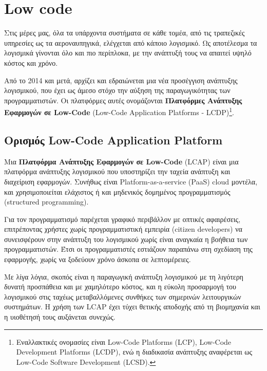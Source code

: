 \chapter{Low code}
    Στις μέρες μας, όλα τα υπάρχοντα συστήματα σε κάθε τομέα, από τις τραπεζικές υπηρεσίες ως τα αεροναυπηγικά, ελέγχεται από κάποιο λογισμικό.
    Ως αποτέλεσμα τα λογισμικά γίνονται όλο και πιο περίπλοκα, με την ανάπτυξή τους να απαιτεί υψηλό κόστος και χρόνο.

    Από το 2014 και μετά, αρχίζει και εδραιώνεται μια νέα προσέγγιση ανάπτυξης λογισμικού, που έχει ως άμεσο στόχο την αύξηση της παραγωγικότητας των προγραμματιστών.
    Οι πλατφόρμες αυτές ονομάζονται \textbf{Πλατφόρμες Ανάπτυξης Εφαρμογών σε Low-Code} (Low-Code Application Platforms - LCDP)\footnote{Εναλλακτικές ονομασίες είναι Low-Code Platforms (LCP), Low-Code Development Platforms (LCDP), ενώ η διαδικασία ανάπτυξης αναφέρεται ως Low-Code Software Development (LCSD).}. \cite{Bock2021} \cite{Bucaioni2022}

    \section{Ορισμός Low-Code Application Platform}
        Μια \textbf{Πλατφόρμα Ανάπτυξης Εφαρμογών σε Low-Code} (LCAP) είναι μια πλατφόρμα ανάπτυξης λογισμικού που υποστηρίζει την ταχεία ανάπτυξη και διαχείριση εφαρμογών.
            Συνήθως είναι Platform-as-a-service (PaaS) cloud μοντέλα, και χρησιμοποιείται ελάχιστος ή και μηδενικός δομημένος προγραμματισμός (structured \linebreak programming).

        Για τον προγραμματισμό παρέχεται γραφικό περιβάλλον με οπτικές αφαιρέσεις, επιτρέποντας χρήστες χωρίς προγραμματιστική εμπειρία (citizen developers) να συνεισφέρουν στην ανάπτυξη του λογισμικού χωρίς είναι αναγκαία η βοήθεια των προγραμματιστών.
        Έτσι οι προγραμματιστές εστιάζουν παραπάνω στη σχεδίαση της εφαρμογής, χωρίς να ξοδεύουν χρόνο άσκοπα σε λεπτομέρειες.

        Με λίγα λόγια, σκοπός είναι η παραγωγική ανάπτυξη λογισμικού με τη λιγότερη δυνατή προσπάθεια και με χαμηλότερο κόστος, και η εύκολη προσαρμογή του λογισμικού στις ταχέως μεταβαλλόμενες συνθήκες των σημερινών λειτουργικών συστημάτων.
        Η χρήση των LCAP έχει τύχει θετικής αποδοχής από τη βιομηχανία και η υιοθέτησή τους αυξάνεται συνεχώς. \cite{Bock2021} \cite{Sahay2020} \cite{Bucaioni2022}

        \begin{displayquote} \justifying
             \cite{Ibm_2024}
        \end{displayquote}


